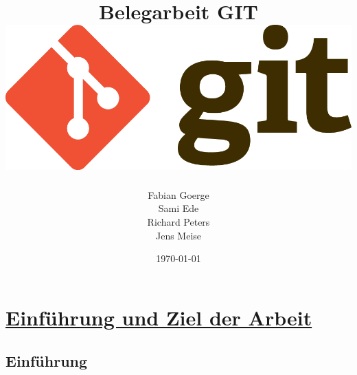 \documentclass[a4paper]{article}
\begin{document}
\title{\textbf{{\Huge { Belegarbeit GIT \vspace{2cm}} 
\includegraphics[width=\textwidth]{git-logo.png}	%
\vspace{2cm} }}}
\author{Fabian Goerge \\  Sami Ede  \\ Richard Peters \\ Jens Meise}
\date{\today}
\maketitle
\thispagestyle{empty} 								%


\newpage

\setcounter{page}{1} 								%
\tableofcontents									%


\newpage

\section{\underline{Einführung und Ziel der Arbeit}} 	%

\subsection{Einführung} 								%
\end{document}

